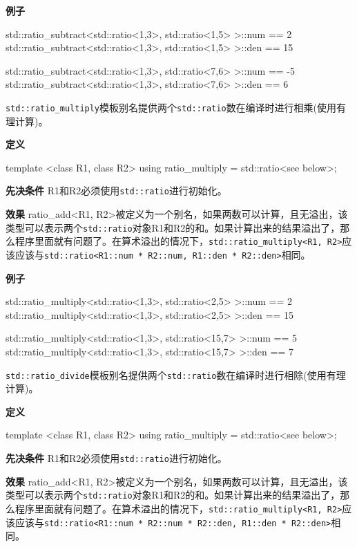 \textbf{例子}

\begin{cpp}
std::ratio_subtract<std::ratio<1,3>, std::ratio<1,5> >::num == 2
std::ratio_subtract<std::ratio<1,3>, std::ratio<1,5> >::den == 15

std::ratio_subtract<std::ratio<1,3>, std::ratio<7,6> >::num == -5
std::ratio_subtract<std::ratio<1,3>, std::ratio<7,6> >::den == 6
\end{cpp}


\texttt{std::ratio\_multiply}模板别名提供两个\texttt{std::ratio}数在编译时进行相乘(使用有理计算)。

\textbf{定义}

\begin{cpp}
template <class R1, class R2>
using ratio_multiply = std::ratio<see below>;
\end{cpp}

\textbf{先决条件}
R1和R2必须使用\texttt{std::ratio}进行初始化。

\textbf{效果}
ratio\_add<R1, R2>被定义为一个别名，如果两数可以计算，且无溢出，该类型可以表示两个\texttt{std::ratio}对象R1和R2的和。如果计算出来的结果溢出了，那么程序里面就有问题了。在算术溢出的情况下，\texttt{std::ratio\_multiply<R1, R2>}应该应该与\texttt{std::ratio<R1::num * R2::num, R1::den * R2::den>}相同。

\textbf{例子}

\begin{cpp}
std::ratio_multiply<std::ratio<1,3>, std::ratio<2,5> >::num == 2
std::ratio_multiply<std::ratio<1,3>, std::ratio<2,5> >::den == 15

std::ratio_multiply<std::ratio<1,3>, std::ratio<15,7> >::num == 5
std::ratio_multiply<std::ratio<1,3>, std::ratio<15,7> >::den == 7
\end{cpp}


\texttt{std::ratio\_divide}模板别名提供两个\texttt{std::ratio}数在编译时进行相除(使用有理计算)。

\textbf{定义}

\begin{cpp}
template <class R1, class R2>
using ratio_multiply = std::ratio<see below>;
\end{cpp}

\textbf{先决条件}
R1和R2必须使用\texttt{std::ratio}进行初始化。

\textbf{效果}
ratio\_add<R1, R2>被定义为一个别名，如果两数可以计算，且无溢出，该类型可以表示两个\texttt{std::ratio}对象R1和R2的和。如果计算出来的结果溢出了，那么程序里面就有问题了。在算术溢出的情况下，\texttt{std::ratio\_multiply<R1, R2>}应该应该与\texttt{std::ratio<R1::num * R2::num * R2::den, R1::den * R2::den>}相同。

